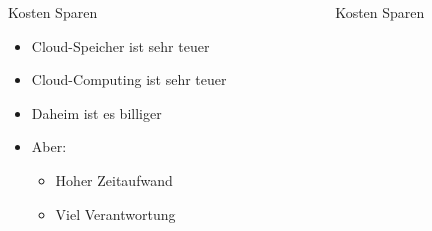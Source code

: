 \documentclass[
    ngerman,
    accentcolor=3b,
    fontsize= 12pt,
    a4paper,
    aspectratio=169,
    colorback=true,
    fancy_row_colors,
    leqno,
    fleqn,
    boxarc=3pt,
    fleqn,
    main,
    design=2008,
]{algoslides}
\begin{document}
    \begin{frame}
        \slidehead{}
        \begin{columns}
            \begin{column}{.5\textwidth}
                Kosten Sparen
                \begin{itemize}
                    \item Cloud-Speicher ist sehr teuer
                    \item Cloud-Computing ist sehr teuer
                    \item Daheim ist es billiger
                    \item Aber: \begin{itemize}
                            \item Hoher Zeitaufwand
                            \item Viel Verantwortung
                        \end{itemize}
                \end{itemize}
            \end{column}%
            \begin{column}{.5\textwidth}
                \begin{figure}[ht!]
                    \centering
                    \Huge\faDollarSign{}
                    \caption{Kosten Sparen}
                    \label{fig:kosten-sparen}
                \end{figure}
            \end{column}%
        \end{columns}
    \end{frame}
\end{document}
